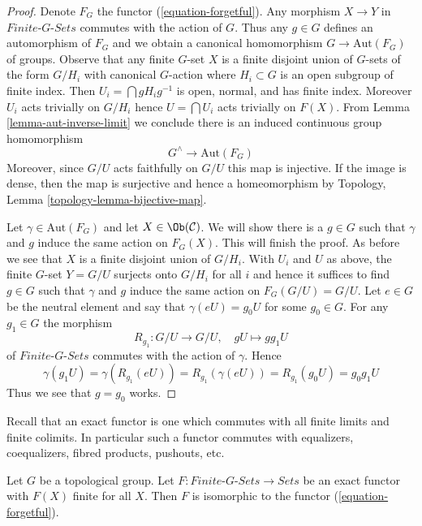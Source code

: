 \begin{proof}
Denote $F_G$ the functor (\ref{equation-forgetful}). Any morphism
$X \to Y$ in $\textit{Finite-}G\textit{-Sets}$ commutes with the action
of $G$. Thus any $g \in G$ defines an automorphism of $F_G$ and
we obtain a canonical homomorphism $G \to \text{Aut}(F_G)$ of groups.
Observe that any finite $G$-set $X$ is a finite disjoint union of
$G$-sets of the form $G/H_i$ with canonical $G$-action where
$H_i \subset G$ is an open subgroup of finite index. Then
$U_i = \bigcap gH_ig^{-1}$ is open, normal, and has finite index.
Moreover $U_i$ acts trivially on $G/H_i$ hence
$U = \bigcap U_i$ acts trivially on $F(X)$.
From Lemma \ref{lemma-aut-inverse-limit} we conclude there is an induced
continuous group homomorphism
$$
G^\wedge \longrightarrow \text{Aut}(F_G)
$$
Moreover, since $G/U$ acts faithfully on $G/U$ this map is
injective. If the image is dense, then the map is surjective and hence a
homeomorphism by Topology, Lemma \ref{topology-lemma-bijective-map}.

\medskip\noindent
Let $\gamma \in \text{Aut}(F_G)$ and let $X \in \Ob(\mathcal{C})$.
We will show there is a $g \in G$ such that $\gamma$ and $g$
induce the same action on $F_G(X)$. This will finish the proof.
As before we see that $X$ is a finite disjoint union of $G/H_i$.
With $U_i$ and $U$ as above, the finite $G$-set $Y = G/U$
surjects onto $G/H_i$ for all $i$ and hence it suffices to
find $g \in G$ such that $\gamma$ and $g$ induce the same action
on $F_G(G/U) = G/U$. Let $e \in G$ be the neutral element and
say that $\gamma(eU) = g_0U$ for some $g_0 \in G$. For any
$g_1 \in G$ the morphism
$$
R_{g_1} : G/U \longrightarrow G/U,\quad gU \longmapsto gg_1U
$$
of $\textit{Finite-}G\textit{-Sets}$ commutes with the action of
$\gamma$. Hence
$$
\gamma(g_1U) = \gamma(R_{g_1}(eU)) = R_{g_1}(\gamma(eU)) =
R_{g_1}(g_0U) = g_0g_1U
$$
Thus we see that $g = g_0$ works.
\end{proof}

\noindent
Recall that an exact functor is one which commutes with all
finite limits and finite colimits. In particular such a functor
commutes with equalizers, coequalizers, fibred products,
pushouts, etc.

\begin{lemma}
\label{lemma-second-fundamental-functor}
Let $G$ be a topological group. Let
$F : \textit{Finite-}G\textit{-Sets} \to \textit{Sets}$
be an exact functor with $F(X)$ finite for all $X$.
Then $F$ is isomorphic to the functor (\ref{equation-forgetful}).
\end{lemma}

